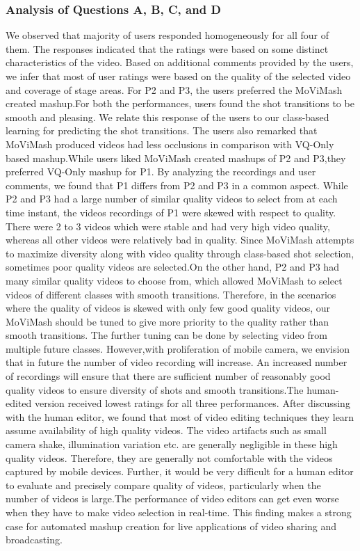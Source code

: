 \documentclass{IEEEtran}
\begin{document}
\subsubsection{Analysis of Questions A, B, C, and D}
We observed that majority of users responded homogeneously for all four of them. The responses indicated that the ratings were based on some distinct characteristics of the video. Based on additional comments provided by the users, we infer that most of user ratings were based on the quality of the selected video and coverage of stage areas. For P2 and P3, the users preferred the MoViMash created mashup.For both the performances, user\textquotesingle s found the shot transitions to be
smooth and pleasing. We relate this response of the user\textquotesingle s to our class-based learning for predicting the shot transitions. The users also remarked that MoViMash produced videos had less occlusions in comparison with VQ-Only based mashup.While users liked MoViMash created mashups of P2 and P3,they preferred VQ-Only mashup for P1. By analyzing the recordings and user comments, we found that P1 differs from P2 and P3 in a common aspect. While P2 and P3 had a large number of similar quality videos to select from at each time instant, the videos recordings of P1 were skewed with respect to quality. There were 2 to 3 videos which were stable and had very high video quality, whereas all other videos were relatively bad in quality. Since MoViMash attempts to maximize diversity along with video quality through class-based shot selection, sometimes poor quality videos are selected.On the other hand, P2 and P3 had many similar quality videos
to choose from, which allowed MoViMash to select videos of different classes with smooth transitions. Therefore, in the scenarios where the quality of videos is skewed with only few good quality videos, our MoViMash should be tuned to give more priority to the quality rather than smooth transitions. The further tuning can be done by selecting video from multiple future classes. However,with proliferation of mobile camera, we envision that in future the number of video recording will increase. An increased number of recordings will ensure that there are sufficient number of reasonably good quality videos to ensure diversity of shots and smooth transitions.The human-edited version received lowest ratings for all three performances. After discussing with the human editor, we found that most of video editing techniques they learn assume availability of high quality videos. The video artifacts such as small camera shake, illumination variation etc. are generally negligible in these high quality videos. Therefore, they are generally not comfortable with the videos captured by mobile devices. Further, it would be very difficult for a human editor to evaluate and precisely compare quality of videos, particularly when the number of videos is large.The performance of video editors can get even worse when they have to make video selection in real-time. This finding makes a strong case for automated mashup creation for live applications of video sharing and broadcasting.
\end{document}
